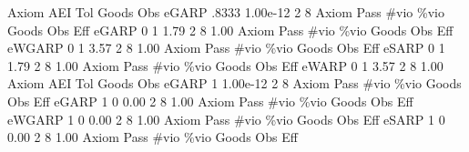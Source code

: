 {\smallskip}
       Axiom {\VBAR}       AEI        Tol      Goods        Obs 
       eGARP {\VBAR}     .8333   1.00e-12          2          8 
{\smallskip}
{\smallskip}
{\smallskip}
       Axiom {\VBAR} Pass        \#vio        \%vio       Goods         Obs         Eff  
       eGARP {\VBAR}    0           1        1.79           2           8        1.00  
{\smallskip}
{\smallskip}
{\smallskip}
       Axiom {\VBAR} Pass        \#vio        \%vio       Goods         Obs         Eff  
      eWGARP {\VBAR}    0           1        3.57           2           8        1.00  
{\smallskip}
{\smallskip}
{\smallskip}
       Axiom {\VBAR} Pass        \#vio        \%vio       Goods         Obs         Eff  
       eSARP {\VBAR}    0           1        1.79           2           8        1.00  
{\smallskip}
{\smallskip}
{\smallskip}
       Axiom {\VBAR} Pass        \#vio        \%vio       Goods         Obs         Eff  
       eWARP {\VBAR}    0           1        3.57           2           8        1.00  
{\smallskip}
       Axiom {\VBAR}       AEI        Tol      Goods        Obs 
       eGARP {\VBAR}         1   1.00e-12          2          8 
{\smallskip}
{\smallskip}
{\smallskip}
       Axiom {\VBAR} Pass        \#vio        \%vio       Goods         Obs         Eff  
       eGARP {\VBAR}    1           0        0.00           2           8        1.00  
{\smallskip}
{\smallskip}
{\smallskip}
       Axiom {\VBAR} Pass        \#vio        \%vio       Goods         Obs         Eff  
      eWGARP {\VBAR}    1           0        0.00           2           8        1.00  
{\smallskip}
{\smallskip}
{\smallskip}
       Axiom {\VBAR} Pass        \#vio        \%vio       Goods         Obs         Eff  
       eSARP {\VBAR}    1           0        0.00           2           8        1.00  
{\smallskip}
{\smallskip}
{\smallskip}
       Axiom {\VBAR} Pass        \#vio        \%vio       Goods         Obs         Eff  
